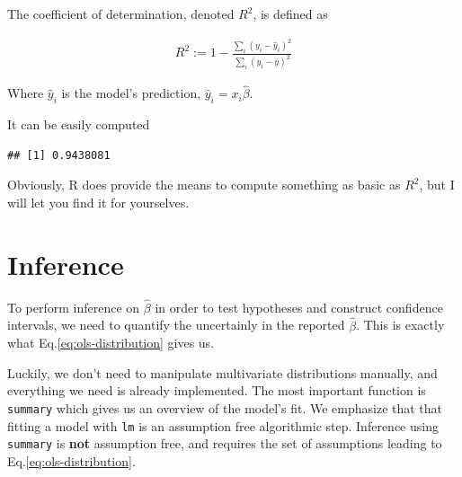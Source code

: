 \documentclass[]{book}
\newenvironment{Shaded}{\begin{snugshade}}{\end{snugshade}}
\newcommand{\KeywordTok}[1]{\textcolor[rgb]{0.13,0.29,0.53}{\textbf{{#1}}}}
\newcommand{\DecValTok}[1]{\textcolor[rgb]{0.00,0.00,0.81}{{#1}}}
\newcommand{\FloatTok}[1]{\textcolor[rgb]{0.00,0.00,0.81}{{#1}}}
\newcommand{\StringTok}[1]{\textcolor[rgb]{0.31,0.60,0.02}{{#1}}}
\newcommand{\NormalTok}[1]{{#1}}
\theoremstyle{definition}
\theoremstyle{definition}
\theoremstyle{remark}
\let\BeginKnitrBlock\begin \let\EndKnitrBlock\end
\begin{document}
\BeginKnitrBlock{definition}
\protect\hypertarget{def:unnamed-chunk-97}{}{\label{def:unnamed-chunk-97}}The
coefficient of determination, denoted \(R^2\), is defined as

\begin{align}
  R^2:= 1-\frac{\sum_i (y_i - \hat y_i)^2}{\sum_i (y_i - \bar y)^2}
\end{align}

Where \(\hat y_i\) is the model's prediction,
\(\hat y_i = x_i \hat \beta\).
\EndKnitrBlock{definition}

It can be easily computed

\begin{Shaded}
\end{Shaded}

\begin{verbatim}
## [1] 0.9438081
\end{verbatim}

Obviously, R does provide the means to compute something as basic as
\(R^2\), but I will let you find it for yourselves.

\section{Inference}\label{inference}

To perform inference on \(\hat \beta\) in order to test hypotheses and
construct confidence intervals, we need to quantify the uncertainly in
the reported \(\hat \beta\). This is exactly what
Eq.\eqref{eq:ols-distribution} gives us.

Luckily, we don't need to manipulate multivariate distributions
manually, and everything we need is already implemented. The most
important function is \texttt{summary} which gives us an overview of the
model's fit. We emphasize that that fitting a model with \texttt{lm} is
an assumption free algorithmic step. Inference using \texttt{summary} is
\textbf{not} assumption free, and requires the set of assumptions
leading to Eq.\eqref{eq:ols-distribution}.
\end{document}
